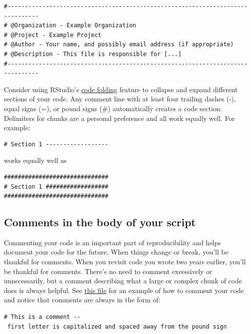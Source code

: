 \documentclass[]{book}
\begin{document}
\begin{verbatim}
#-------------------------------------------------------------------------------
# @Organization - Example Organization
# @Project - Example Project
# @Author - Your name, and possibly email address (if appropriate)
# @Description - This file is responsible for [...]
#-------------------------------------------------------------------------------
\end{verbatim}

Consider using RStudio's \href{https://support.rstudio.com/hc/en-us/articles/200484568-Code-Folding-and-Sections}{code folding} feature to collapse and expand different sections of your code. Any comment line with at least four trailing dashes (-), equal signs (=), or pound signs (\#) automatically creates a code section. Delimiters for chunks are a personal preference and all work equally well. For example:

\begin{verbatim}
# Section 1 ------------------
\end{verbatim}

works equally well as

\begin{verbatim}
##############################
# Section 1 ##################
##############################
\end{verbatim}

\hypertarget{comments-in-the-body-of-your-script}{%
\subsection{Comments in the body of your script}\label{comments-in-the-body-of-your-script}}

Commenting your code is an important part of reproducibility and helps document your code for the future. When things change or break, you'll be thankful for comments. When you revisit code you wrote two years earlier, you'll be thankful for comments. There's no need to comment excessively or unnecessarily, but a comment describing what a large or complex chunk of code does is always helpful. See \href{https://github.com/kmishra9/Flu-Absenteeism/blob/master/Master's\%20Thesis\%20-\%20Spatial\%20Epidemiology\%20of\%20Influenza/1b\%20-\%20Map-Management.R}{this file} for an example of how to comment your code and notice that comments are always in the form of:

\texttt{\#\ This\ is\ a\ comment\ -\/-\ first\ letter\ is\ capitalized\ and\ spaced\ away\ from\ the\ pound\ sign}
\end{document}
